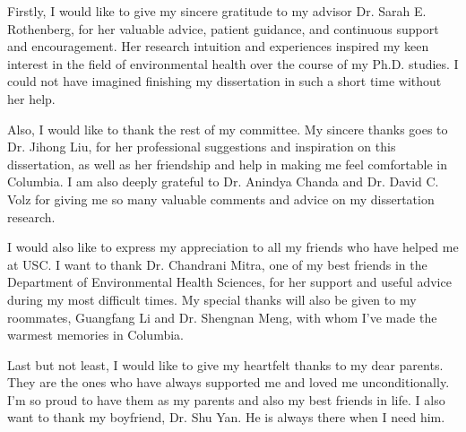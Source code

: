 Firstly, I would like to give my sincere gratitude to my advisor Dr. Sarah E. Rothenberg, for her valuable advice, patient guidance, and continuous support and encouragement. Her research intuition and experiences inspired my keen interest in the field of environmental health over the course of my Ph.D. studies. I could not have imagined finishing my dissertation in such a short time without her help.

Also, I would like to thank the rest of my committee. My sincere thanks goes to Dr. Jihong Liu, for her professional suggestions and inspiration on this dissertation, as well as her friendship and help in making me feel comfortable in Columbia. I am also deeply grateful to Dr. Anindya Chanda and Dr. David C. Volz for giving me so many valuable comments and advice on my dissertation research. 

I would also like to express my appreciation to all my friends who have helped me at USC. I want to thank Dr. Chandrani Mitra, one of my best friends in the Department of Environmental Health Sciences, for her support and useful advice during my most difficult times. My special thanks will also be given to my roommates, Guangfang Li and Dr. Shengnan Meng, with whom I've made the warmest memories in Columbia.

Last but not least, I would like to give my heartfelt thanks to my dear parents. They are the ones who have always supported me and loved me unconditionally. I'm so proud to have them as my parents and also my best friends in life. I also want to thank my boyfriend, Dr. Shu Yan. He is always there when I need him. 
